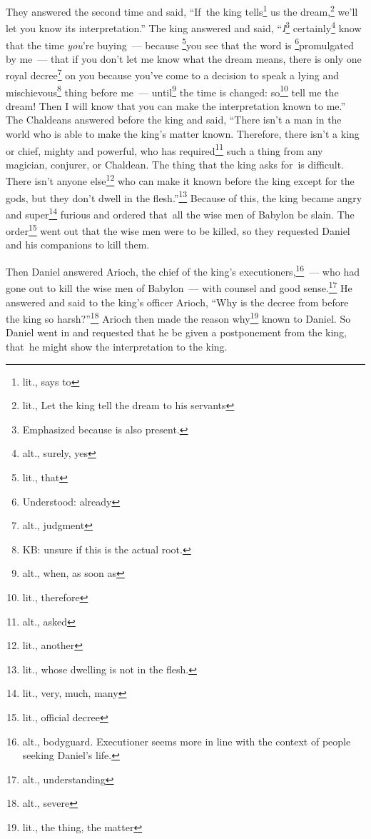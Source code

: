 \begin{inparaenum}
     They answered the second time and said, ``If\understood\ the king tells\footnote{lit., says to} us the dream,\footnote{lit., Let the king tell the dream to his servants} we'll let you know its interpretation.''%
     The king answered and said, ``\emph{I}\footnote{Emphasized because  is also present.} certainly\footnote{alt., surely, yes} know that the time \emph{you}'re buying~--- because \footnote{lit., that}you see that the word is \footnote{Understood: already}promulgated by me~---%
     that if you don't let me know what the dream means\understood, there is only one royal decree\footnote{alt., judgment} on you because you've come to a decision to speak a lying and mischievous\footnote{KB: unsure if this is the actual root.} thing before me~--- until\footnote{alt., when, as soon as} the time is changed: so\footnote{lit., therefore} tell me the dream! Then I will know that you can make the interpretation known to me.''%
     The Chaldeans answered before the king and said, ``There isn't a man in the world who is able to make the king's matter known. Therefore, there isn't a king or chief, mighty and powerful, who has required\footnote{alt., asked} such a thing from any magician, conjurer, or Chaldean.%
     The thing that the king asks for\understood\ is difficult. There isn't anyone else\footnote{lit., another} who can make it known before the king except for the gods, but they don't dwell in the flesh.''\footnote{lit., whose dwelling is not in the flesh.}%
     Because of this, the king became angry and super\footnote{lit., very, much, many} furious and ordered that\understood\ all the wise men of Babylon be slain.%
     The order\footnote{lit., official decree} went out that the wise men were to be killed, so they requested Daniel and his companions to kill them.%
    
     Then Daniel answered Arioch, the chief of the king's executioners,\footnote{alt., bodyguard. Executioner seems more in line with the context of people seeking Daniel's life.}~--- who had gone out to kill the wise men of Babylon~--- with counsel and good sense.\footnote{alt., understanding}%
     He answered and said to the king's officer Arioch, ``Why is the decree from before the king so harsh?''\footnote{alt., severe} Arioch then made the reason why\footnote{lit., the thing, the matter} known to Daniel.%
     So Daniel went in and requested that he be given a postponement from the king, that\understood\ he might show the interpretation to the king.%
    

\end{inparaenum}
